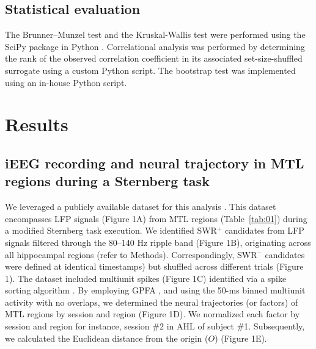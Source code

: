 \documentclass[final,3p,times,twocolumn]{elsarticle}
\begin{document}
\subsection{Statistical evaluation}
The Brunner--Munzel test and the Kruskal-Wallis test were performed using the SciPy package in Python \cite{virtanen_scipy_2020}. Correlational analysis was performed by determining the rank of the observed correlation coefficient in its associated set-size-shuffled surrogate using a custom Python script. The bootstrap test was implemented using an in-house Python script.

\label{sec:methods}
\section{Results}
\subsection{iEEG recording and neural trajectory in MTL regions during a Sternberg task}
We leveraged a publicly available dataset for this analysis \cite{boran_dataset_2020}. This dataset encompasses LFP signals (Figure 1A) from MTL regions (Table~\ref{tab:01}) during a modified Sternberg task execution. We identified SWR$^+$ candidates from LFP signals filtered through the 80--140 Hz ripple band (Figure 1B), originating across all hippocampal regions (refer to Methods). Correspondingly, SWR$^-$ candidates were defined at identical timestamps) but shuffled across different trials (Figure 1). The dataset included multiunit spikes (Figure 1C) identified via a spike sorting algorithm \cite{niediek_reliable_2016}. By employing GPFA \cite{yu_gaussian-process_2009}, and using the 50-ms binned multiunit activity with no overlaps, we determined the neural trajectories (or factors) of MTL regions by session and region (Figure 1D). We normalized each factor by session and region for instance, session \#2 in AHL of subject \#1. Subsequently, we calculated the Euclidean distance from the origin ($O$) (Figure 1E).
\end{document}
